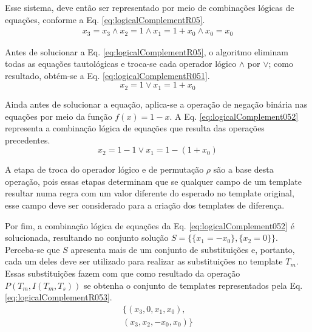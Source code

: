 Esse sistema, deve então ser representado por meio de combinações lógicas de equações, conforme a Eq. \eqref{eq:logicalComplementR05}.
\begin{equation}
\begin{split}
x_3 = x_3		\wedge  
x_2 = 1			\wedge  
x_1 = 1+x_0		\wedge  
x_0 = x_0
\end{split}
\label{eq:logicalComplementR05}
\end{equation}

Antes de solucionar a Eq. \eqref{eq:logicalComplementR05}, o algoritmo eliminam todas as equações tautológicas e troca-se cada operador lógico $\wedge$ por $\vee$; como resultado, obtém-se a Eq. \eqref{eq:logicalComplementR051}.
\begin{equation}
x_2 = 1		\vee	x_1 = 1+x_0
\label{eq:logicalComplementR051}
\end{equation}

Ainda antes de solucionar a equação, aplica-se a operação de negação binária nas equações por meio da função $f(x) = 1 - x$. A Eq. \eqref{eq:logicalComplement052} representa a combinação lógica de equações que resulta das operações precedentes.
\begin{equation}
x_2 = 1 - 1		\vee	x_1 = 1 - (1 + x_0)
\label{eq:logicalComplement052}
\end{equation}

A etapa de troca do operador lógico e de permutação $\rho$ são a base desta operação, pois essas etapas determinam que se qualquer campo de um template resultar numa regra com um valor diferente do esperado no template original, esse campo deve ser considerado para a criação dos templates de diferença.

Por fim, a combinação lógica de equações da Eq. \eqref{eq:logicalComplement052} é solucionada, resultando no conjunto solução $S = \{\{x_1 = -x_0\}, \{x_2 = 0\}\}$. Perceba-se que $S$ apresenta mais de um conjunto de substituições e, portanto, cada um deles deve ser utilizado para realizar as substituições no template $T_m$. Essas substituições fazem com que como resultado da operação $P(T_m, I(T_m, T_s))$ se obtenha o conjunto de templates representados pela Eq. \eqref{eq:logicalComplementR053}.
\begin{equation}
\begin{split}
\{(x_3, 0, x_1, x_0), \\(x_3, x_2, -x_0, x_0)\}
\end{split}
\label{eq:logicalComplementR053}
\end{equation}

